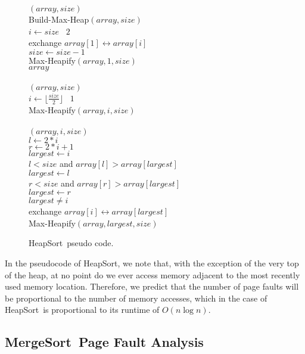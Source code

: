 \documentclass[11pt]{article}
\newcommand{\heapsort}{{\sc HeapSort}}
\newcommand{\mergesort}{{\sc MergeSort}}
\begin{document}
\begin{figure}
\begin{algorithm}
$(array, size)$\+\\
    Build-Max-Heap$(array, size)$\\
    \For $i \gets size$ \DownTo\ $2$\+\\
        exchange $array[1] \leftrightarrow array[i]$\\
        $size \gets size - 1$\\
        Max-Heapify$(array, 1, size)$\-\\
    \Return $array$\-\\
\\
$(array, size)$\+\\
    \For $i \gets \lfloor \frac{size}{2} \rfloor$ \DownTo\ $1$\+\\
        Max-Heapify$(array, i, size)$\-\-\\
\\
$(array, i, size)$\+\\
    $l \gets 2*i$\\
    $r \gets 2*i + 1$\\
    $largest \gets i$\\
    \If $l < size$ and $array[l] > array[largest]$\+\\
            $largest \gets l$\-\\
    \If $r < size$ and $array[r] > array[largest]$\+\\
            $largest \gets r$\-\\
    \If $largest \neq i$\+\\
        exchange $array[i] \leftrightarrow array[largest]$\\
        Max-Heapify$(array, largest, size)$
\end{algorithm}

\caption{\heapsort\ pseudo code.}
\label{fig:hsort}
\end{figure}

In the pseudocode of \heapsort, we note that, with the exception of the very
top of the heap, at no point do we ever access memory adjacent to the most
recently used memory location.  Therefore, we predict that the number of page
faults will be proportional to the number of memory accesses, which in the case
of \heapsort\ is proportional to its runtime of $O(n \log n)$.

\subsection{\mergesort\ Page Fault Analysis} 
\end{document}
